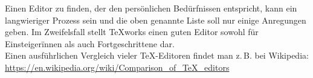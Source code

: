 \documentclass[
	ausgabe=2025-01-13,
	titel=Installationshinweise,
	shortverb=true,
]{../tex/latexkurs-exercise}
\begin{document}
\noindent Einen Editor zu finden, der den persönlichen Bedürfnissen entspricht, kann ein langwieriger Prozess sein und die oben genannte Liste soll nur einige Anregungen geben. Im Zweifelsfall stellt \TeX works  einen guten Editor sowohl für Einsteigerïnnen als auch Fortgeschrittene dar.\\Einen ausführlichen Vergleich vieler \TeX-Editoren findet man z.\,B. bei Wikipedia:\\ \url{https://en.wikipedia.org/wiki/Comparison_of_TeX_editors}

\end{document}
